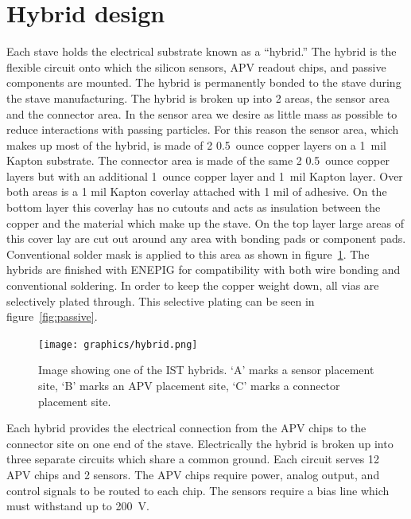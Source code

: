 \documentclass[preprint,12pt]{elsarticle}
\begin{document}
\section{Hybrid design}
Each stave holds the electrical substrate known as a ``hybrid.''  The hybrid is
the flexible circuit onto which the silicon sensors, APV readout chips, and passive
components are mounted. The hybrid is permanently bonded to the stave during
the stave manufacturing. The hybrid is broken up into 2 areas, the sensor area
and the connector area. In the sensor
area we desire as little mass as possible to reduce interactions with passing
particles. For this reason the sensor area, which makes up most of the hybrid,
is made of 2 0.5~ounce copper layers on a 1~mil Kapton substrate. The connector
area is made of the same 2 0.5~ounce copper layers but with an additional
1~ounce copper layer and 1~mil Kapton layer. Over both areas is a 1 mil Kapton
coverlay attached with 1 mil of adhesive. On the bottom layer this coverlay has
no cutouts and acts as insulation between the copper and the material which make
up the stave. On the top layer large areas of this cover lay are cut out around
any area with bonding pads or component pads. Conventional solder mask is
applied to this area as shown in figure~\ref{fig:hybrid}. The hybrids are finished with ENEPIG for compatibility
with both wire bonding and conventional soldering. In order to keep the copper
weight down, all vias are selectively plated through.  This selective plating
can be seen in figure~\ref{fig:passive}.

\begin{figure}[h]
\begin{center}
\texttt{[image: graphics/hybrid.png]}
\caption{Image showing one of the IST hybrids. `A' marks a sensor placement site,
`B' marks an APV placement site, `C' marks a connector placement site.
\label{fig:hybrid}}
\end{center}
\end{figure}
%
Each hybrid provides the electrical connection from the APV chips to the
connector site on one end of the stave. Electrically the hybrid is broken up
into three separate circuits which share a common ground. Each circuit
serves 12 APV chips and 2 sensors. The APV chips require power, analog output,
and control signals to be routed to each chip. The sensors require a bias line
which must withstand up to 200~V.
\end{document}

